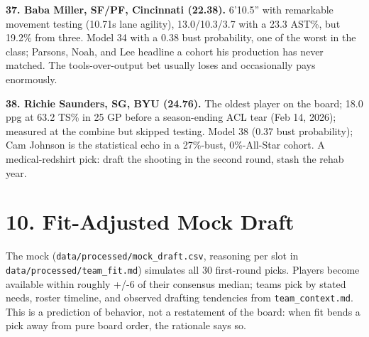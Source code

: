 \documentclass[
  10pt,
]{article}
\begin{document}
\textbf{37. Baba Miller, SF/PF, Cincinnati (22.38).} 6'10.5'' with remarkable
movement testing (10.71s lane agility), 13.0/10.3/3.7 with a 23.3 AST\%, but
19.2\% from three. Model 34 with a 0.38 bust probability, one of the worst in
the class; Parsons, Noah, and Lee headline a cohort his production has never
matched. The tools-over-output bet usually loses and occasionally pays
enormously.

\textbf{38. Richie Saunders, SG, BYU (24.76).} The oldest player on the board;
18.0 ppg at 63.2 TS\% in 25 GP before a season-ending ACL tear (Feb 14, 2026);
measured at the combine but skipped testing. Model 38 (0.37 bust probability);
Cam Johnson is the statistical echo in a 27\%-bust, 0\%-All-Star cohort. A
medical-redshirt pick: draft the shooting in the second round, stash the rehab
year.

\section{10. Fit-Adjusted Mock Draft}\label{fit-adjusted-mock-draft}

The mock (\texttt{data/processed/mock\_draft.csv}, reasoning per slot in
\texttt{data/processed/team\_fit.md}) simulates all 30 first-round picks.
Players become available within roughly +/-6 of their consensus median; teams
pick by stated needs, roster timeline, and observed drafting tendencies from
\texttt{team\_context.md}. This is a prediction of behavior, not a restatement
of the board: when fit bends a pick away from pure board order, the rationale
says so.
\end{document}
